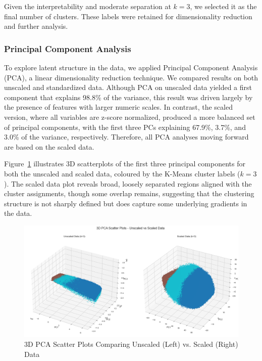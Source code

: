 \documentclass{article}
\begin{document}
Given the interpretability and moderate separation at $k=3$, we selected it as the final number of clusters. These labels were retained for dimensionality reduction and further analysis.


\subsubsection{Principal Component Analysis}

To explore latent structure in the data, we applied Principal Component Analysis (PCA), a linear dimensionality reduction technique. We compared results on both unscaled and standardized data. Although PCA on unscaled data yielded a first component that explains 98.8\% of the variance, this result was driven largely by the presence of features with larger numeric scales. In contrast, the scaled version, where all variables are z-score normalized, produced a more balanced set of principal components, with the first three PCs explaining 67.9\%, 3.7\%, and 3.0\% of the variance, respectively. Therefore, all PCA analyses moving forward are based on the scaled data.

Figure~\ref{fig:pca3d} illustrates 3D scatterplots of the first three principal components for both the unscaled and scaled data, coloured by the K-Means cluster labels ($k=3$). The scaled data plot reveals broad, loosely separated regions aligned with the cluster assignments, though some overlap remains, suggesting that the clustering structure is not sharply defined but does capture some underlying gradients in the data.

\begin{figure}[H]
    \centering
    \includegraphics[width=\textwidth]{figures/pca3d_scaled_vs_unscaled.png}
    \caption{3D PCA Scatter Plots Comparing Unscaled (Left) vs. Scaled (Right) Data}
    \label{fig:pca3d}
\end{figure}
\end{document}
